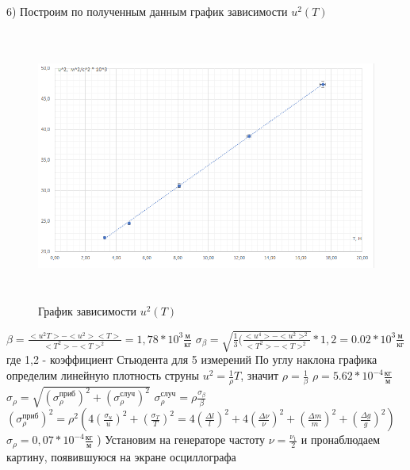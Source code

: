 \documentclass[12pt,a4paper]{article}
\begin{document}
6) Построим по полученным данным график зависимости $u^2(T)$
\begin{center}
\begin{figure}[H]
\centering
\includegraphics[width=15cm, height=9cm]{1.4.5_gr_2}
\caption{График зависимости $u^2(T)$}
\label{gr:2}
\end{figure}
\end{center}
$\beta=\frac{<u^2T>-<u^2><T>}{<T^2>-<T>^2}=1,78*10^3\frac{\text{м}}{\text{кг}}$ \hfill \break
$\sigma_{\beta}=\sqrt{\frac{1}{3}(\frac{<u^4>-<u^2>^2}{<T^2>-<T>^2}}*1,2=0.02*10^3\frac{\text{м}}{\text{кг}}$ \hfill \break
где 1,2 - коэффициент Стьюдента для 5 измерений \hfill \break
По углу наклона графика определим линейную плотность струны \hfill \break
$u^2=\frac{1}{\rho}T$, значит $\rho=\frac{1}{\beta}$\hfill \break
$\rho=5.62*10^{-4}\frac{\text{кг}}{\text{м}}$
\hfill \break
$\sigma_{\rho}=\sqrt{(\sigma^{\text{приб}}_{\rho})^2+(\sigma^{\text{случ}}_{\rho})^2}$ \hfill \break
$\sigma^{\text{случ}}_{\rho}=\rho\frac{\sigma_{\beta}}{\beta}$ \hfill \break
$(\sigma^{\text{приб}}_{\rho})^2=\rho^2(4(\frac{\sigma_{u}}{u})^2+(\frac{\sigma_{T}}{T})^2=4(\frac{\Delta{l}}{l})^2+4(\frac{\Delta{\nu}}{\nu})^2+(\frac{\Delta{m}}{m})^2+(\frac{\Delta{g}}{g})^2)$ \hfill \break
$\sigma_{\rho}=0,07*10^{-4}\frac{\text{кг}}{\text{м}}$ \hfill {}) Установим на генераторе частоту $\nu=\frac{\nu_{1}}{2}$ и пронаблюдаем картину, появившуюся на экране осциллографа 
\end{document}
